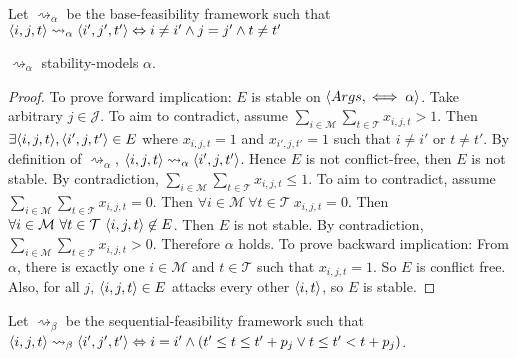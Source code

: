 \begin{definition}
	Let $\rightsquigarrow_\alpha$ be the base-feasibility framework such that $\langle{i},{j},{t}\rangle\rightsquigarrow_\alpha\langle{i'},{j'},{t'}\rangle\Leftrightarrow i\neq i'\land j=j'\land t\neq t'$ 
\end{definition}

\begin{lemma}
	\label{stabilityalpha}
	$\rightsquigarrow_\alpha$ stability-models $\alpha$.
	
	\begin{proof}
		To prove forward implication: $E$ is stable on $\langle{Args},{\iff\alpha}\rangle$. Take arbitrary $j\in\mathcal{J}$. To aim to contradict, assume $\sum_{i\in\mathcal{M}}\sum_{t\in\mathcal{T}}x_{i,j,t}>1$. Then $\exists\langle{i},{j},{t}\rangle,\langle{i'},{j},{t'}\rangle\in E$ where $x_{i,j,t}=1$ and $x_{i',j,t'}=1$ such that $i\neq i'$ or $t\neq t'$. By definition of $\rightsquigarrow_\alpha$, $\langle{i},{j},{t}\rangle\rightsquigarrow_\alpha\langle{i'},{j},{t'}\rangle$. Hence $E$ is not conflict-free, then $E$ is not stable. By contradiction, $\sum_{i\in\mathcal{M}}\sum_{t\in\mathcal{T}}x_{i,j,t}\leq 1$. To aim to contradict, assume $\sum_{i\in\mathcal{M}}\sum_{t\in\mathcal{T}}x_{i,j,t}=0$. Then $\forall i\in\mathcal{M}\ \forall t\in\mathcal{T}\ x_{i,j,t}=0$. Then $\forall i\in\mathcal{M}\ \forall t\in\mathcal{T}\ \langle{i},{j},{t}\rangle\not\in E$. Then $E$ is not stable. By contradiction, $\sum_{i\in\mathcal{M}}\sum_{t\in\mathcal{T}}x_{i,j,t}>0$. Therefore $\alpha$ holds.
		\linespace
		To prove backward implication: From $\alpha$, there is exactly one $i\in\mathcal{M}$ and $t\in\mathcal{T}$ such that $x_{i,j,t}=1$. So $E$ is conflict free. Also, for all $j$, $\langle{i},{j},{t}\rangle\in E$ attacks every other $\langle{i},{t}\rangle$, so $E$ is stable.
	\end{proof}
\end{lemma}

\begin{definition}
	Let $\rightsquigarrow_\beta$ be the sequential-feasibility framework such that $\langle{i},{j},{t}\rangle\rightsquigarrow_\beta\langle{i'},{j'},{t'}\rangle\Leftrightarrow i=i'\land(t'\leq t\leq t'+p_j\lor t\leq t'<t+p_j)$.
\end{definition}

